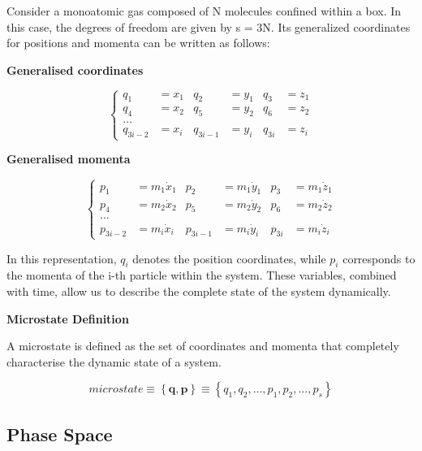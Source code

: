 \documentclass[12pt,a4paper]{report}
\newcommand{\esp}{\vspace{0.5cm}}
\begin{document}
	Consider a monoatomic gas composed of N molecules confined within a box. In this case, the degrees of freedom are given by s = 3N. Its generalized coordinates for positions and momenta can be written as
	follows:
	
	\esp
	
	\noindent \textbf{Generalised coordinates}
	
	\esp
	
	$$
	\left\{
	\begin{aligned}
		q_1 &= x_1 & q_2 &= y_1 & q_3 &= z_1 \\
		q_4 &= x_2 & q_5 &= y_2 & q_6 &= z_2 \\
		\dots \\
		q_{3i-2} &= x_i & q_{3i-1} &= y_i & q_{3i} &= z_i
	\end{aligned}
	\right.
	$$

	\esp
	
	\noindent \textbf{Generalised momenta}
	
	\esp

	$$
	\left\{
	\begin{aligned}
		p_1 &= m_1 \dot{x}_1 & p_2 &= m_1 \dot{y}_1 & p_3 &= m_1 \dot{z}_1 \\
		p_4 &= m_2 \dot{x}_2 & p_5 &= m_2 \dot{y}_2 & p_6 &= m_2 \dot{z}_2 \\
		\dots \\
		p_{3i-2} &= m_i \dot{x}_i & p_{3i-1} &= m_i \dot{y}_i & p_{3i} &= m_i \dot{z}_i
	\end{aligned}
	\right.
	$$
	
	\esp
	
	In this representation, $q_i$ denotes the position coordinates, while $p_i$ corresponds to the momenta of the i-th particle within the system. These variables, combined with time, allow us to describe the complete state of the system dynamically.

	\esp 
	
	\noindent \textbf{Microstate Definition}
	
	\esp
	
	A microstate is defined as the set of coordinates and momenta that completely characterise the dynamic state of a system.
	
	\begin{equation}
		microstate \equiv \left\{\mathbf{q}, \mathbf{p}\right\} \equiv \left\{ q_1, q_2, \dots, p_1, p_2, \dots, p_s \right\}
	\end{equation}
	
	\subsection{Phase Space}
	
\end{document}
